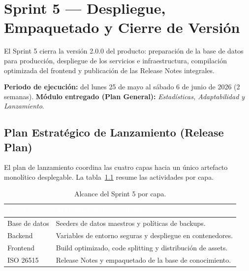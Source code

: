 \chapter{Sprint 5 — Despliegue, Empaquetado y Cierre de Versión}
\label{cap:sprint5}

El Sprint 5 cierra la versión 2.0.0 del producto: preparación de la base de datos para
producción, despliegue de los servicios e infraestructura, compilación optimizada del frontend y
publicación de las Release Notes integrales.\par

\textbf{Periodo de ejecución:} del lunes 25 de mayo al sábado 6 de junio de 2026 (2 semanas).
\textbf{Módulo entregado (Plan General):} \textit{Estadísticas, Adaptabilidad y Lanzamiento}.\par

\section{Plan Estratégico de Lanzamiento (Release Plan)}
\label{sec:s5_resumen}

El plan de lanzamiento coordina las cuatro capas hacia un único artefacto monolítico
desplegable. La tabla~\ref{tab:s5_alcance} resume las actividades por capa.

\begin{table}[!ht]
    \centering
    \renewcommand{\arraystretch}{1.35}
    \fontsize{9}{10.8}\selectfont\sffamily
    \begin{tabularx}{\textwidth}{|l|X|}
        \hline
        \rowcolor{colorPrimario}
        \textcolor{white}{\textbf{Capa}} & \textcolor{white}{\textbf{Actividad de lanzamiento}} \\ \hline
        Base de datos & Seeders de datos maestros y políticas de backups. \\ \hline
        \rowcolor{grisTecnico}
        Backend & Variables de entorno seguras y despliegue en contenedores. \\ \hline
        Frontend & Build optimizado, code splitting y distribución de assets. \\ \hline
        \rowcolor{grisTecnico}
        ISO 26515 & Release Notes y empaquetado de la base de conocimiento. \\ \hline
    \end{tabularx}
    \caption{Alcance del Sprint 5 por capa.}
    \label{tab:s5_alcance}
\end{table}

